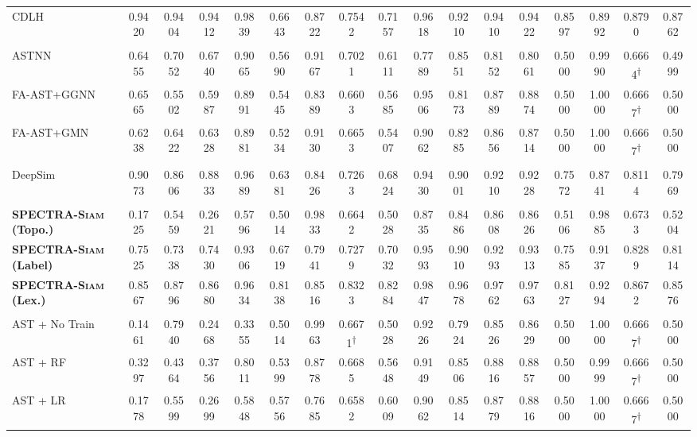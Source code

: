 \documentclass[authoryear,final,5p,times,twocolumn]{elsarticle}
\newcommand{\method}{\textsc{SPECTRA-Siam}}
\newcommand{\degscore}[1]{%
  \cellcolor{red!10}#1\textsuperscript{\ensuremath{\dagger}}}
\theoremstyle{plain}
\begin{document}
\begin{table}[t]
{\begin{tabular}{@{}l*{16}{c}@{}}
CDLH & 0.9420 & 0.9404 & 0.9412 & 0.9839 & 0.6643 & 0.8722 & 0.7542 & 0.7157 & 0.9618 & 0.9210 & 0.9410 & 0.9422 & 0.8597 & 0.8992 & 0.8790 & 0.8762 \\
\rowcolor{black!7}\multicolumn{17}{@{}l}{\textit{Other graph-based learning methods}} \\
ASTNN & 0.6455 & 0.7052 & 0.6740 & 0.9065 & 0.5690 & 0.9167 & 0.7021 & 0.6111 & 0.7789 & 0.8551 & 0.8152 & 0.8061 & 0.5000 & 0.9990 & \degscore{0.6664} & 0.4999 \\
FA-AST+GGNN & 0.6565 & 0.5502 & 0.5987 & 0.8991 & 0.5445 & 0.8389 & 0.6603 & 0.5685 & 0.9506 & 0.8173 & 0.8789 & 0.8874 & 0.5000 & 1.0000 & \degscore{0.6667} & 0.5000 \\
FA-AST+GMN & 0.6238 & 0.6422 & 0.6328 & 0.8981 & 0.5234 & 0.9130 & 0.6653 & 0.5407 & 0.9062 & 0.8285 & 0.8656 & 0.8714 & 0.5000 & 1.0000 & \degscore{0.6667} & 0.5000 \\
\rowcolor{black!7}\multicolumn{17}{@{}l}{\textit{Hybrid graph + code baseline}} \\
DeepSim & 0.9073 & 0.8606 & 0.8833 & 0.9689 & 0.6381 & 0.8426 & 0.7263 & 0.6824 & 0.9430 & 0.9001 & 0.9210 & 0.9228 & 0.7572 & 0.8741 & 0.8114 & 0.7969 \\
\rowcolor{black!7}\multicolumn{17}{@{}l}{\textit{Our method}} \\
\textbf{\method{} (Topo.)}
& 0.1725 & 0.5459 & 0.2621 & 0.5796
& 0.5014 & 0.9833 & 0.6642 & 0.5028
& 0.8735 & 0.8486 & 0.8608 & 0.8626
& 0.5106 & 0.9885 & 0.6733 & 0.5204 \\
\textbf{\method{} (Label)}
& 0.7525 & 0.7338 & 0.7430 & 0.9306
& 0.6719 & 0.7941 & 0.7279 & 0.7032
& 0.9593 & 0.9010 & 0.9293 & 0.9313
& 0.7585 & 0.9137 & 0.8289 & 0.8114 \\
\textbf{\method{} (Lex.)}
& 0.8567 & 0.8796 & 0.8680 & 0.9634
& 0.8138 & 0.8516 & 0.8323 & 0.8284
& 0.9847 & 0.9678 & 0.9762 & 0.9763
& 0.8127 & 0.9294 & 0.8672 & 0.8576 \\
\rowcolor{black!7}\multicolumn{17}{@{}l}{\textit{Fixed spectral-representation baselines}} \\
AST + No Train & 0.1461 & 0.7940 & 0.2468 & 0.3355 & 0.5014 & 0.9963 & \degscore{0.6671} & 0.5028 & 0.9226 & 0.7924 & 0.8526 & 0.8629 & 0.5000 & 1.0000 & \degscore{0.6667} & 0.5000 \\
AST + RF & 0.3297 & 0.4364 & 0.3756 & 0.8011 & 0.5399 & 0.8778 & 0.6685 & 0.5648 & 0.9149 & 0.8506 & 0.8816 & 0.8857 & 0.5000 & 0.9999 & \degscore{0.6667} & 0.5000 \\
AST + LR & 0.1778 & 0.5599 & 0.2699 & 0.5848 & 0.5756 & 0.7685 & 0.6582 & 0.6009 & 0.9062 & 0.8514 & 0.8779 & 0.8816 & 0.5000 & 1.0000 & \degscore{0.6667} & 0.5000 \\

\end{tabular}}
\end{table}
\end{document}
